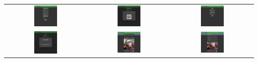 \begin{tabular}{ccc}
	\includegraphics[width=0.3\textwidth]{assets/img/screenshots/1-registrazione.png} &
	\includegraphics[width=0.3\textwidth]{assets/img/screenshots/2-qrcode.png} &
	\includegraphics[width=0.3\textwidth]{assets/img/screenshots/3-login.png} \\
	\includegraphics[width=0.3\textwidth]{assets/img/screenshots/4-errore_login.png} &
	\includegraphics[width=0.3\textwidth]{assets/img/screenshots/5-homepage.png} &
	\includegraphics[width=0.3\textwidth]{assets/img/screenshots/6-tags.png}\\

\end{tabular}
